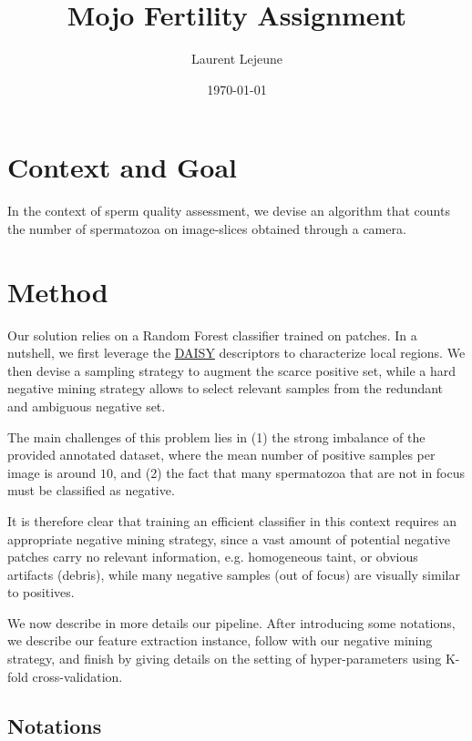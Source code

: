 \documentclass[11pt]{article}
\author{Laurent Lejeune}
\date{\today}
\title{Mojo Fertility Assignment}
\begin{document}
\maketitle

\section{Context and Goal}
\label{sec:org466e312}

In the context of sperm quality assessment, we devise an algorithm that counts the number of spermatozoa
on image-slices obtained through a camera.


\section{Method}
\label{sec:orgdd813ff}

Our solution relies on a Random Forest classifier trained on patches.
In a nutshell, we first leverage the \href{https://www.epfl.ch/labs/cvlab/software/descriptors-and-keypoints/daisy/}{DAISY} descriptors to characterize local regions.
We then devise a sampling strategy to augment the scarce positive set, while a hard negative mining strategy allows to select relevant samples from the redundant and ambiguous
negative set.

The main challenges of this problem lies in (1) the strong imbalance of the provided annotated dataset, where the mean number of positive samples per image is around \(10\), and (2) the fact that many spermatozoa that are not
in focus must be classified as negative.

It is therefore clear that training an efficient classifier in this context requires an appropriate
negative mining strategy, since a vast amount of potential negative patches carry no relevant information, e.g.
homogeneous taint, or obvious artifacts (debris), while many negative samples (out of focus) are visually similar to
positives.

We now describe in more details our pipeline.
After introducing some notations, we describe our feature extraction instance, follow with
our negative mining strategy, and finish by giving details on the setting of hyper-parameters using K-fold cross-validation.


\subsection{Notations}
\label{sec:orgc77ef82}
\end{document}
